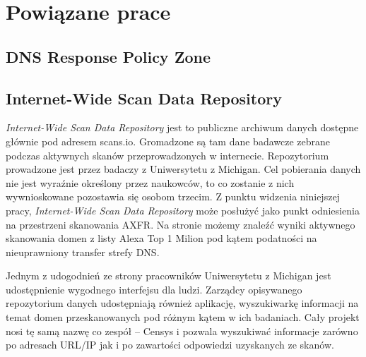\chapter{Powiązane prace}

\section{DNS Response Policy Zone}

\section{Internet-Wide Scan Data Repository}
\textit{Internet-Wide Scan Data Repository} jest to publiczne archiwum danych dostępne głównie pod adresem scans.io\cite{scansio}. Gromadzone są tam dane badawcze zebrane podczas aktywnych skanów przeprowadzonych w internecie. Repozytorium prowadzone jest przez badaczy z Uniwersytetu z Michigan\cite{teamcensys}. Cel pobierania danych nie jest wyraźnie określony przez naukowców, to co zostanie z nich wywnioskowane pozostawia się osobom trzecim. Z punktu widzenia niniejszej pracy, \textit{Internet-Wide Scan Data Repository} może posłużyć jako punkt odniesienia na przestrzeni skanowania AXFR. Na stronie możemy znaleźć wyniki aktywnego skanowania domen z listy Alexa Top 1 Milion\cite{alexa} pod kątem podatności na nieuprawniony transfer strefy DNS.

Jednym z udogodnień ze strony pracowników Uniwersytetu z Michigan jest udostępnienie wygodnego interfejsu dla ludzi. Zarządcy opisywanego repozytorium danych udostępniają również aplikację, wyszukiwarkę informacji na temat domen przeskanowanych pod różnym kątem w ich badaniach. Cały projekt nosi tę samą nazwę co zespół -- Censys\cite{censys} i pozwala wyszukiwać informacje zarówno po adresach URL/IP jak i po zawartości odpowiedzi uzyskanych ze skanów.